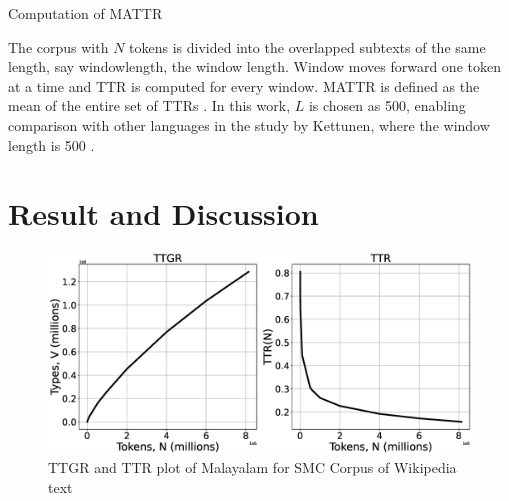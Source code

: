 \begin{algorithm}[ht]
	\caption{Computation of MATTR}\label{mattr-algorithm}
    \label{alg:mattr}
	\begin{algorithmic}[1]
		 
		\EndWhile
		\EndProcedure
	\end{algorithmic}
\end{algorithm}

The corpus with $N$ tokens is divided into the overlapped subtexts of the same
length, say \gls{windowlength}, the window length. Window moves forward one token at a time
and TTR is computed for every window. MATTR is defined as the mean of the
entire set of TTRs \cite{covington2010cutting}. In this work, $L$ is chosen as
500, enabling comparison with other languages in the study by Kettunen, where
the window length is 500 \cite{kettunen2014can}. %

\section{Result and Discussion}
\begin{figure}[ht]
	\begin{center}

		\includegraphics[width=\textwidth]{tsd1030a.eps}
		\caption{TTGR and TTR plot of Malayalam for SMC Corpus of Wikipedia text}
		\label{fig:TTR_N}

	\end{center}
\end{figure}


